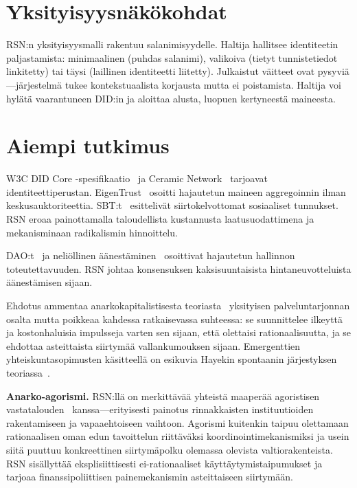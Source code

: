 \documentclass[11pt,a4paper,twocolumn]{article}
\begin{document}
\section{Yksityisyysnäkökohdat}

RSN:n yksityisyysmalli rakentuu salanimisyydelle. Haltija hallitsee identiteetin paljastamista: minimaalinen (puhdas salanimi), valikoiva (tietyt tunnistetiedot linkitetty) tai täysi (laillinen identiteetti liitetty). Julkaistut väitteet ovat pysyviä---järjestelmä tukee kontekstuaalista korjausta mutta ei poistamista. Haltija voi hylätä vaarantuneen DID:in ja aloittaa alusta, luopuen kertyneestä maineesta.

\section{Aiempi tutkimus}

W3C DID Core -spesifikaatio~\cite{did2022} ja Ceramic Network~\cite{ceramic2023} tarjoavat identiteettiperustan. EigenTrust~\cite{kamvar2003} osoitti hajautetun maineen aggregoinnin ilman keskusauktoriteettia. SBT:t~\cite{weyl2022} esittelivät siirtokelvottomat sosiaaliset tunnukset. RSN eroaa painottamalla taloudellista kustannusta laatusuodattimena ja mekanisminaan radikalismin hinnoittelu.

DAO:t~\cite{buterin2014} ja neliöllinen äänestäminen~\cite{buterin2019} osoittivat hajautetun hallinnon toteutettavuuden. RSN johtaa konsensuksen kaksisuuntaisista hintaneuvotteluista äänestämisen sijaan.

Ehdotus ammentaa anarkokapitalistisesta teoriasta~\cite{rothbard1973,hoppe2001} yksityisen palveluntarjonnan osalta mutta poikkeaa kahdessa ratkaisevassa suhteessa: se suunnittelee ilkeyttä ja kostonhaluisia impulsseja varten sen sijaan, että olettaisi rationaalisuutta, ja se ehdottaa asteittaista siirtymää vallankumouksen sijaan. Emergenttien yhteiskuntasopimusten käsitteellä on esikuvia Hayekin spontaanin järjestyksen teoriassa~\cite{hayek1973}.

\textbf{Anarko-agorismi.} RSN:llä on merkittävää yhteistä maaperää agoristisen vastatalouden~\cite{konkin2006} kanssa---erityisesti painotus rinnakkaisten instituutioiden rakentamiseen ja vapaaehtoiseen vaihtoon. Agorismi kuitenkin taipuu olettamaan rationaalisen oman edun tavoittelun riittäväksi koordinointimekanismiksi ja usein siitä puuttuu konkreettinen siirtymäpolku olemassa olevista valtiorakenteista. RSN sisällyttää eksplisiittisesti ei-rationaaliset käyttäytymistaipumukset ja tarjoaa finanssipoliittisen painemekanismin asteittaiseen siirtymään.
\end{document}
